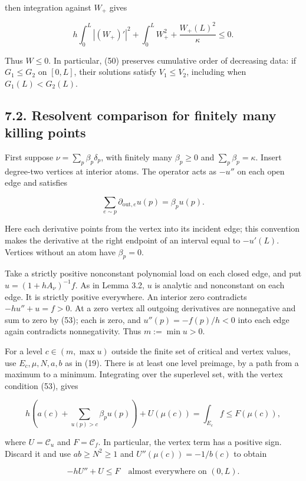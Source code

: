 \documentclass[11pt]{article}
\begin{document}
then integration against \(W_+\) gives

\[
h\int_0^L|(W_+)'|^2+\int_0^L W_+^2
+\frac{W_+(L)^2}{\kappa}\le0.
\tag{52}
\]

Thus \(W\le0\). In particular, (50) preserves cumulative order of
decreasing data: if \(G_1\le G_2\) on \([0,L]\), their solutions satisfy
\(V_1\le V_2\), including when \(G_1(L)<G_2(L)\).

\subsection{7.2. Resolvent comparison for finitely many killing
points}\label{resolvent-comparison-for-finitely-many-killing-points}

First suppose \(\nu=\sum_p\beta_p\delta_p\), with finitely many
\(\beta_p\ge0\) and \(\sum_p\beta_p=\kappa\). Insert degree-two vertices
at interior atoms. The operator acts as \(-u''\) on each open edge and
satisfies

\[
\sum_{e\sim p}\partial_{\mathrm{out},e}u(p)=\beta_pu(p).
\tag{53}
\]

Here each derivative points from the vertex into its incident edge; this
convention makes the derivative at the right endpoint of an interval
equal to \(-u'(L)\). Vertices without an atom have \(\beta_p=0\).

Take a strictly positive nonconstant polynomial load on each closed
edge, and put \(u=(1+hA_\nu)^{-1}f\). As in Lemma 3.2, \(u\) is analytic
and nonconstant on each edge. It is strictly positive everywhere. An
interior zero contradicts \(-hu''+u=f>0\). At a zero vertex all outgoing
derivatives are nonnegative and sum to zero by (53); each is zero, and
\(u''(p)=-f(p)/h<0\) into each edge again contradicts nonnegativity.
Thus \(m:=\min u>0\).

For a level \(c\in(m,\max u)\) outside the finite set of critical and
vertex values, use \(E_c,\mu,N,a,b\) as in (19). There is at least one
level preimage, by a path from a maximum to a minimum. Integrating over
the superlevel set, with the vertex condition (53), gives

\[
h\left(a(c)+\sum_{u(p)>c}\beta_pu(p)\right)
+U(\mu(c))=\int_{E_c}f\le F(\mu(c)),
\tag{54}
\]

where \(U=\mathcal C_u\) and \(F=\mathcal C_f\). In particular, the
vertex term has a positive sign. Discard it and use \(ab\ge N^2\ge1\)
and \(U''(\mu(c))=-1/b(c)\) to obtain

\[
-hU''+U\le F\quad\text{almost everywhere on }(0,L).
\tag{55}
\]
\end{document}
